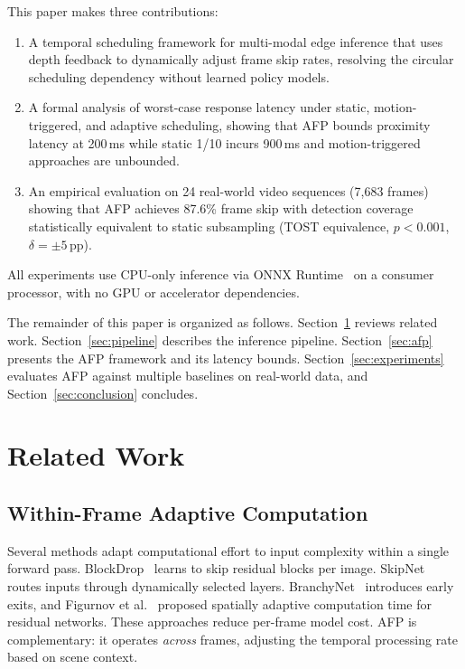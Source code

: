 \documentclass[conference]{IEEEtran}
\begin{document}
This paper makes three contributions:
\begin{enumerate}
  \item A temporal scheduling framework for multi-modal edge
    inference that uses depth feedback to dynamically adjust frame
    skip rates, resolving the circular scheduling dependency without
    learned policy models.
  \item A formal analysis of worst-case response latency under
    static, motion-triggered, and adaptive scheduling, showing that
    AFP bounds proximity latency at 200\,ms while static 1/10
    incurs 900\,ms and motion-triggered approaches are unbounded.
  \item An empirical evaluation on 24 real-world video sequences
    (7,683 frames) showing that AFP achieves 87.6\% frame skip with
    detection coverage statistically equivalent to static
    subsampling (TOST equivalence, $p < 0.001$,
    $\delta{=}{\pm}5$\,pp).
\end{enumerate}

All experiments use CPU-only inference via ONNX
Runtime~\cite{onnxruntime2019} on a consumer processor, with no GPU
or accelerator dependencies.

The remainder of this paper is organized as follows.
Section~\ref{sec:related} reviews related work.
Section~\ref{sec:pipeline} describes the inference pipeline.
Section~\ref{sec:afp} presents the AFP framework and its latency
bounds. Section~\ref{sec:experiments} evaluates AFP against multiple
baselines on real-world data, and Section~\ref{sec:conclusion}
concludes.

\section{Related Work}
\label{sec:related}

\subsection{Within-Frame Adaptive Computation}

Several methods adapt computational effort to input complexity
within a single forward pass.
BlockDrop~\cite{wu2018blockdrop} learns to skip residual blocks per
image. SkipNet~\cite{wang2018skipnet} routes inputs through
dynamically selected layers.
BranchyNet~\cite{teerapittayanon2016branchynet} introduces early
exits, and Figurnov et al.~\cite{figurnov2017spatially} proposed
spatially adaptive computation time for residual networks. These
approaches reduce per-frame model cost. AFP is complementary: it
operates \emph{across} frames, adjusting the temporal processing
rate based on scene context.
\end{document}
